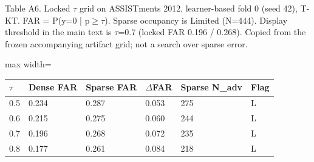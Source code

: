 \documentclass[10pt,a4paper]{article}
\begin{document}
\vspace{0.55em}
\noindent\begin{minipage}{\textwidth}
\centering
{\fontsize{8}{9.5}\selectfont Table A6. Locked $\tau$ grid on ASSISTments 2012, learner-based fold 0 (seed 42), T-KT. FAR = P(y=0 | p$\geq$$\tau$). Sparse occupancy is Limited (N=444). Display threshold in the main text is $\tau$=0.7 (locked FAR 0.196 / 0.268). Copied from the frozen accompanying artifact grid; not a search over sparse error.\par}
\vspace{0.35em}
\begin{adjustbox}{max width=\textwidth}
{\small
\begin{tabular}{@{}llllll@{}}
\toprule
$\tau$ & Dense FAR & Sparse FAR & $\Delta$FAR & Sparse N\_adv & Flag \\
\midrule
0.5 & 0.234 & 0.287 & 0.053 & 275 & L \\
0.6 & 0.215 & 0.275 & 0.060 & 244 & L \\
0.7 & 0.196 & 0.268 & 0.072 & 235 & L \\
0.8 & 0.177 & 0.261 & 0.084 & 218 & L \\
\bottomrule
\end{tabular}}
\end{adjustbox}
\end{minipage}
\vspace{0.55em}
\end{document}
